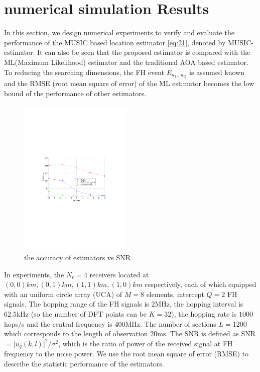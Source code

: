\documentclass[journal,10pt]{IEEEtran}
\begin{document}
\section{numerical simulation Results}
\label{sec:experiment}
In this section, we design numerical experiments to verify and evaluate the performance of the MUSIC based location estimator \eqref{eq:21}, denoted by MUSIC-estimator. 
It can also be seen that the proposed estimator is compared with the ML(Maximum Likelihood) estimator and the traditional AOA based estimator.  
To reducing the searching dimensions, the FH event $E_{\kappa_1\dots\kappa_Q}$ is assumed known and the RMSE (root mean square of error) of the ML estimator becomes the low bound of the performance of other estimators.




\begin{figure}[!t] 
    \centerline{\includegraphics[width=0.48\textwidth]{figures/simu_vsSNR.pdf}}
	\caption{the accuracy of estimators vs SNR}\label{fig:1}
\end{figure}



In experiments, the $N_r=4$ receivers located at $(0,0)km,(0,1)km,(1,1)km,(1,0)km$ respectively, each of which equipped with an uniform circle array (UCA) of $M=8$ elements, intercept $Q=2$ FH signals. 
The hopping range of the FH signals is $2$MHz, the hopping interval is $62.5$kHz (so the number of DFT points can be $K=32$), the hopping rate is $1000$hops/s and the central frequency is $400$MHz. 
The number of sections $L=1200$ which corresponds to the length of observation $20$ms.
The SNR is defined as SNR$=\vert\bar{u}_q(k,l)\vert^2/\sigma^2$, which is the ratio of power of the received signal at FH frequency to the noise power. 
We use the root mean square of error (RMSE) to describe the statistic performance of the estimators.
\end{document}

